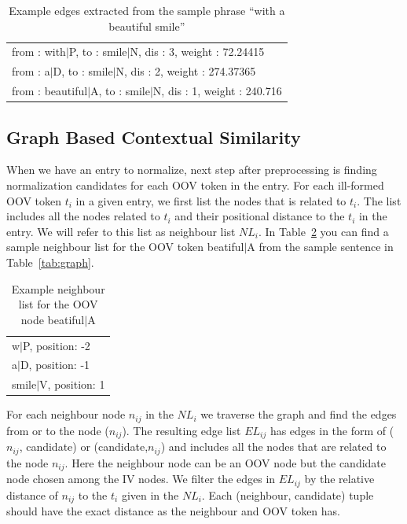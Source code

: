 \documentclass[preprint,review,12pt]{elsarticle}
\begin{document}
\begin{table}[hbt]
  \centering
  \begin{tabular}[tc]{l}
 from : with$|$P, to : smile$|$N, dis : 3, weight : 72.24415 \\
 from : a$|$D, to : smile$|$N, dis : 2, weight : 274.37365 \\
 from : beautiful$|$A, to : smile$|$N, dis : 1, weight : 240.716 \\
\end{tabular}
  \caption{Example edges extracted from the sample phrase  ``with a beautiful smile''}
\label{tab:edges}
\end{table}


\subsection{Graph Based Contextual Similarity}

When we have an entry to normalize, next step after preprocessing is finding normalization candidates for each OOV token in the entry. For each ill-formed OOV token $t_i$ in a given entry, we first list the nodes that is related to $t_i$. The list includes all the nodes related to $t_i$ and their positional distance to the $t_i$ in the entry. We will refer to this list as neighbour list $NL_i$. In Table~\ref{tab:neigh} you can find a sample neighbour list for the OOV token beatiful$|$A from the sample sentence in Table~\ref{tab:graph}.

\begin{table}[hbt]
  \centering
  \begin{tabular}[tc]{l}
    w$|$P, position: -2 \\
    a$|$D, position: -1 \\
    smile$|$V, position: 1 \\
  \end{tabular}
\caption{Example neighbour list for the OOV node beatiful$|$A}
\label{tab:neigh}
\end{table}


For each neighbour node $n_{ij}$ in the $NL_i$  we traverse the graph and find the edges from or to the node ($n_{ij}$). The resulting edge list $EL_{ij}$ has edges in the form of ($n_{ij}$, candidate) or (candidate,$n_{ij}$) and includes all the nodes that are related to the node $n_{ij}$. Here the neighbour node can be an OOV node but the candidate node chosen among the IV nodes. We filter the edges in $EL_{ij}$ by the relative distance of $n_{ij}$ to the $t_i$ given in the $NL_i$. Each (neighbour, candidate) tuple should have the exact distance as the neighbour and OOV token has.
\end{document}
